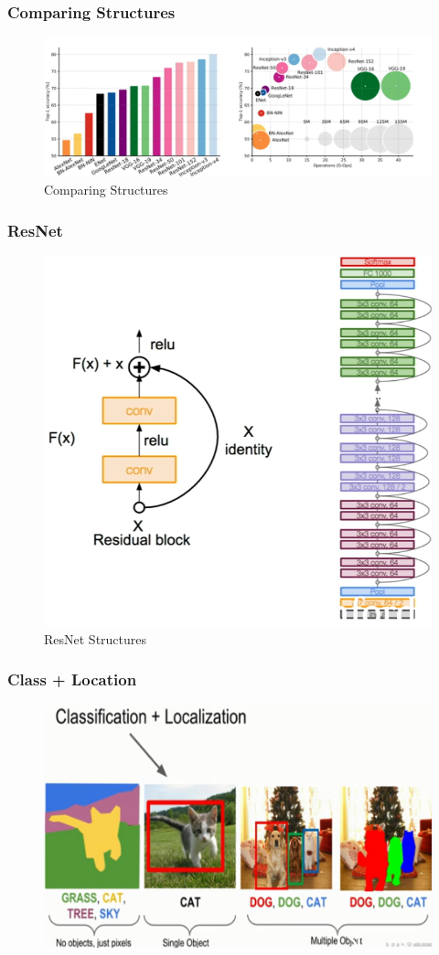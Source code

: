 \documentclass{beamer}
\begin{document}
\begin{frame}
	
\frametitle{Comparing  Structures}

\begin{figure}
	\includegraphics[width=\linewidth]{Pics/ccomplex.png}
	\caption{Comparing Structures}
\end{figure}

\end{frame}
\begin{frame}
	\frametitle{ResNet}
	
	\begin{figure}
		\includegraphics[width=.6\linewidth]{Pics/resnet.png}
		\caption{ResNet Structures}
	\end{figure}
	
\end{frame}
\begin{frame}
	\frametitle{Class + Location}
	
	\begin{figure}
		\includegraphics[width=\linewidth]{Pics/classloc.PNG}
		
	\end{figure}
	
\end{frame}
\end{document}
